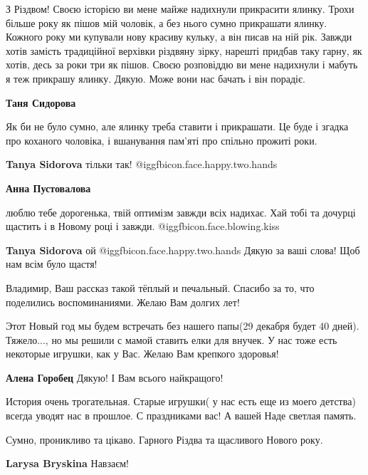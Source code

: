 \begin{itemize}

З Різдвом! Своєю історією ви мене майже надихнули прикрасити ялинку. Трохи більше
року як пішов мій чоловік, а без нього сумно прикрашати ялинку. Кожного року ми
купували нову красиву кульку, а він писав на ній рік. Завжди хотів замість
традиційної верхівки різдвяну зірку, нарешті придбав таку гарну, як хотів, десь за
роки три як пішов. Своєю розповіддю ви мене надихнули і мабуть я теж прикрашу
ялинку. Дякую. Може вони нас бачать і він порадіє.

\begin{itemize} %
\textbf{Таня Сидорова} 

Як би не було сумно, але ялинку треба ставити і прикрашати. Це буде і згадка
про коханого чоловіка, і вшанування пам'яті про спільно прожиті роки.

\textbf{Tanya Sidorova} тільки так!  @igg{fbicon.face.happy.two.hands} 

\textbf{Анна Пустовалова} 

люблю тебе дорогенька, твій оптимізм завжди всіх надихає. Хай тобі та дочурці
щастить і в Новому році і завжди. @igg{fbicon.face.blowing.kiss} 

\textbf{Tanya Sidorova} ой @igg{fbicon.face.happy.two.hands} 
Дякую за ваші слова!
Щоб нам всім було щастя!

\end{itemize} %


Владимир, Ваш рассказ такой тёплый и печальный. Спасибо за то, что поделились
воспоминаниями. Желаю Вам долгих лет!

Этот Новый год мы будем встречать без нашего папы(29 декабря будет 40 дней).
Тяжело..., но мы решили с мамой ставить елки для внучек.  У нас тоже есть
некоторые игрушки, как у Вас. Желаю Вам крепкого здоровья!


\textbf{Алена Горобец} Дякую! І Вам всього найкращого!

История очень трогательная.
Старые игрушки( у нас есть еще из моего детства) всегда уводят нас в прошлое.
С праздниками вас!
А вашей
Наде светлая память.

Сумно, проникливо та цікаво. Гарного Різдва та щасливого Нового року.

\textbf{Larysa Bryskina} Навзаєм!


\end{itemize}
